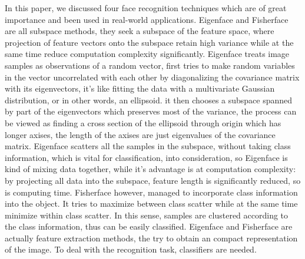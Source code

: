 \documentclass[conference]{IEEEtran}
\begin{document}
In this paper, we discussed four face recognition techniques which are of great importance and been used in real-world applications. Eigenface and Fisherface are all subspace methods, they seek a subspace of the feature space, where projection of feature vectors onto the subspace retain high variance while at the same time reduce computation complexity significantly. Eigenface treats image samples as observations of a random vector, first tries to make random variables in the vector uncorrelated with each other by diagonalizing the covariance matrix with its eigenvectors, it's like fitting the data with a multivariate Gaussian distribution, or in other words, an ellipsoid. it then chooses a subspace spanned by part of the eigenvectors which preserves most of the variance, the process can be viewed as finding a cross section of the ellipsoid through origin which has longer axises, the length of the axises are just eigenvalues of the covariance matrix. Eigenface scatters all the samples in the subspace,  without taking class information, which is vital for classification, into consideration, so Eigenface is kind of mixing data together, while it's advantage is at computation complexity: by projecting all data into the subspace, feature length is significantly reduced, so is computing time. Fisherface however, managed to incorporate class information into the object. It tries to maximize between class scatter while at the same time minimize within class scatter. In this sense, samples are clustered according to the class information, thus can be easily classified. Eigenface and Fisherface are actually feature extraction methods, the try to obtain an compact representation of the image. To deal with the recognition task, classifiers are needed.
\end{document}
